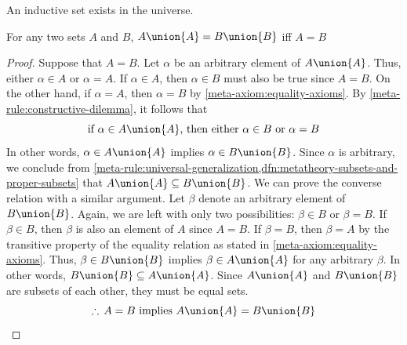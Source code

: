 \begin{meta-axiom}
     \label{meta-axiom:existence-of-inductive-set}
    An inductive set exists in the universe.
\end{meta-axiom}

\begin{thm}
     \label{thm:metatheory-uniqueness-of-successor}
    For any two sets \( A \) and \( B \), \( A \union \mleft\{ A \mright\} = B \union \mleft\{ B \mright\} \) iff \( A = B \)
\end{thm}

\begin{proof}
    Suppose that \( A = B \).
    Let \( \alpha \) be an arbitrary element of \( A \union \mleft\{ A \mright\} \).
    Thus, either \( \alpha \in A \) or \( \alpha = A \).
    If \( \alpha \in A \), then \( \alpha \in B \) must also be true since \( A = B \).
    On the other hand, if \( \alpha = A \), then \( \alpha = B \) by \cref{meta-axiom:equality-axioms}.
    By \cref{meta-rule:constructive-dilemma}, it follows that
    \begin{equation*}
        \text{if \( \alpha \in A \union \mleft\{ A \mright\}\), then either \( \alpha \in B \) or \( \alpha = B \)}
    \end{equation*}
    In other words, \( \alpha \in A \union \mleft\{ A \mright\} \) implies \( \alpha \in B \union \mleft\{ B \mright\} \).
    Since \( \alpha \) is arbitrary, we conclude from \cref{meta-rule:universal-generalization,dfn:metatheory-subsets-and-proper-subsets} that
    \( A \union \mleft\{ A \mright\} \subseteq B \union \mleft\{ B \mright\} \).
    We can prove the converse relation with a similar argument.
    Let \( \beta \) denote an arbitrary element of \( B \union \mleft\{ B \mright\} \).
    Again, we are left with only two possibilities: \( \beta \in B \) or \( \beta = B \).
    If \( \beta \in B \), then \( \beta \) is also an element of \( A \) since \( A = B \).
    If \( \beta = B \), then \( \beta = A \) by the transitive property of the equality relation as stated in \cref{meta-axiom:equality-axioms}.
    Thus, \( \beta \in B \union \mleft\{ B \mright\} \) implies \( \beta \in A \union \mleft\{ A \mright\} \) for any arbitrary \( \beta \).
    In other words, \( B \union \mleft\{ B \mright\} \subseteq A \union \mleft\{ A \mright\} \).
    Since \( A \union \mleft\{ A \mright\} \) and \( B \union \mleft\{ B \mright\} \) are subsets of each other, they must be equal sets.
    \begin{equation*}
        \therefore \, \text{\( A = B \) implies \( A \union \mleft\{ A \mright\} = B \union \mleft\{ B \mright\} \)}
    \end{equation*}


\end{proof}
